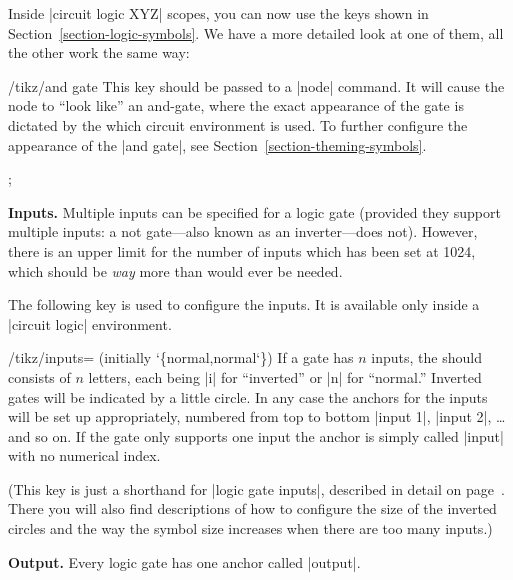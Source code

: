 Inside |circuit logic XYZ| scopes, you can now use the keys shown in
Section~\ref{section-logic-symbols}. We have a more detailed look at
one of them, all the other work the same way:

\begin{key}{/tikz/and gate}
  This key should be passed to a |node| command. It will cause the
  node to ``look like'' an and-gate, where the exact appearance of the
  gate is dictated by the which circuit environment is used.   To
  further configure the appearance of the |and gate|, see 
  Section~\ref{section-theming-symbols}.

\begin{codeexample}[]
 ;    
\end{codeexample}
\begin{codeexample}[]
\end{codeexample}

  \medskip\textbf{Inputs.}
  Multiple inputs can be specified for a logic gate (provided they
  support multiple inputs: a not gate---also known as an
  inverter---does not). However, there is an upper limit for the
  number of inputs which has been set at 1024, which should be \emph{way} 
  more than would ever be needed.

  The following key is used to configure the inputs. It is available
  only inside a |circuit logic| environment.
 
  \begin{key}{/tikz/inputs= (initially \char`\{normal,normal\char`\})}
    If a gate has $n$ inputs, the  should consists of
    $n$ letters, each being |i| for ``inverted'' or |n| for
    ``normal.'' Inverted gates will be indicated by a little
    circle. In any case the anchors for the inputs will be set  
    up appropriately, numbered from top to bottom |input 1|, |input 2|,
    \ldots and so on. If the gate only supports one input the anchor
    is simply called |input| with no numerical index.
\begin{codeexample}[]
\end{codeexample} 
  \end{key}

  (This key is just a shorthand for |logic gate inputs|, described
  in detail on page~\pageref{logic-gate-inputs}. There you will also
  find descriptions of how to configure the size of the inverted
  circles and the way the symbol size increases when there are too
  many inputs.)
  
  \textbf{Output.}
  Every logic gate has one anchor called |output|.
\end{key}


